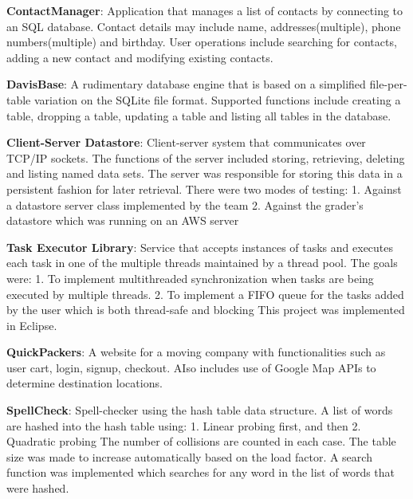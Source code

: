\documentclass[letterpaper,11pt]{article}
\newcommand{\resumeItem}[2]{
  \item\small{
    \textbf{#1}{: #2 \vspace{-2pt}}
  }
}
\newcommand{\resumeSubItem}[2]{\resumeItem{#1}{#2}\vspace{-4pt}}
\begin{document}
\resumeSubItem{ContactManager}
      {Application that manages a list of contacts by connecting to  an SQL database. Contact details may include name, addresses(multiple), phone numbers(multiple) and birthday. User operations include searching for contacts, adding a new contact and modifying existing contacts.}
      
\resumeSubItem{DavisBase}
      {A rudimentary database engine that is based on a simplified file-per-table variation on the SQLite file format. Supported functions include creating a table, dropping a table, updating a table and listing all tables in the database.}
      
      
    \resumeSubItem{Client-Server Datastore}
      {Client-server system that communicates over TCP/IP sockets. The functions of the server included storing, retrieving, deleting and listing named data sets. The server was responsible for storing this data in a persistent fashion for later retrieval. 
There were two modes of testing:
1. Against a datastore server class implemented by the team
2. Against the grader's datastore which was running on an AWS server}
 
 
  \resumeSubItem{Task Executor Library}
      {Service that accepts instances of tasks and executes each task in one of the multiple threads maintained by a thread pool. The goals were:
1. To implement multithreaded synchronization when tasks are being executed by multiple threads.
2. To implement a FIFO queue for the tasks added by the user which is both thread-safe and blocking
This project was implemented in Eclipse.}
      
      
      
    


 \resumeSubItem{QuickPackers}
      {A website for a moving company with functionalities such as user cart, login,  signup, checkout. AIso includes use of Google Map APIs to determine destination locations.
      }
      
      
      
      \resumeSubItem{SpellCheck}
      {Spell-checker using the hash table data structure. A list of words are hashed into the hash table using:
1. Linear probing first, and then
2. Quadratic probing 
The number of collisions are counted in each case. The table size was made to increase automatically based on the load factor.
A search function was implemented which searches for any word in the list of words that were hashed.}
      
      
      
\end{document}
